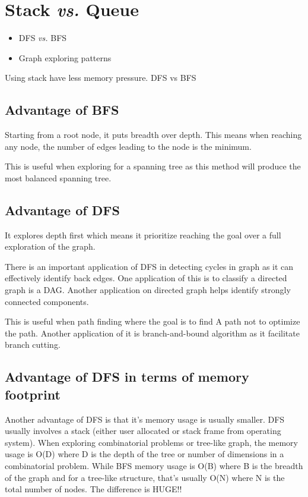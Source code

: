 \documentclass[oneside,11pt]{book}
\theoremstyle{definition}
\theoremstyle{remark}
\begin{document}
\section{Stack \textit{vs.} Queue}
\begin{itemize}
    \item DFS \textit{vs.} BFS \label{Evernote:DFS vs BFS}
    \item Graph exploring patterns
\end{itemize}

Using stack have less memory pressure.
DFS vs BFS

\subsection{Advantage of BFS}
Starting from a root node, it puts breadth over depth.
This means when reaching any node, the number of edges leading to the node is the minimum.

This is useful when exploring for a spanning tree as this method will produce the most balanced
spanning tree.

\subsection{Advantage of DFS}

It explores depth first which means it prioritize reaching the goal over a full exploration of
the graph.

There is an important application of DFS in detecting cycles in graph as it can effectively
identify back edges.
One application of this is to classify a directed graph is a DAG.
Another application on directed graph helps identify strongly connected components.

This is useful when path finding where the goal is to find A path not to optimize the path.
Another application of it is branch-and-bound algorithm as it facilitate branch cutting.


\subsection{Advantage of DFS in terms of memory footprint}

Another advantage of DFS is that it's memory usage is usually smaller.
DFS usually involves a stack (either user allocated or stack frame from operating system).
When exploring combinatorial problems or tree-like graph, the memory usage is O(D) where D is the
depth of the tree or number of dimensions in a combinatorial problem.
While BFS memory usage is O(B) where B is the breadth of the graph and for a tree-like structure,
that's usually O(N) where N is the total number of nodes.
The difference is HUGE!!
\end{document}
